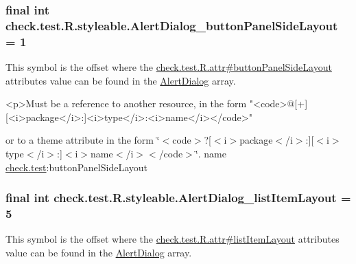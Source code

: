 \subsubsection[{Alert\+Dialog\+\_\+button\+Panel\+Side\+Layout}]{\setlength{\rightskip}{0pt plus 5cm}final int check.\+test.\+R.\+styleable.\+Alert\+Dialog\+\_\+button\+Panel\+Side\+Layout = 1\hspace{0.3cm}{\ttfamily [static]}}\label{classcheck_1_1test_1_1_r_1_1styleable_a929e9b246cebde3d26e0df79ede0734d}
This symbol is the offset where the \hyperlink{classcheck_1_1test_1_1_r_1_1attr_a32cad5c610a0ee38f68d1a530b5e5714}{check.\+test.\+R.\+attr\#button\+Panel\+Side\+Layout} attribute\textquotesingle{}s value can be found in the \hyperlink{classcheck_1_1test_1_1_r_1_1styleable_a1d9c160813dfdd546911e783935ebb65}{Alert\+Dialog} array.

\begin{DoxyVerb}      <p>Must be a reference to another resource, in the form "<code>@[+][<i>package</i>:]<i>type</i>:<i>name</i></code>"
\end{DoxyVerb}
 or to a theme attribute in the form \char`\"{}$<$code$>$?\mbox{[}$<$i$>$package$<$/i$>$\+:\mbox{]}\mbox{[}$<$i$>$type$<$/i$>$\+:\mbox{]}$<$i$>$name$<$/i$>$$<$/code$>$\char`\"{}.  name \hyperlink{namespacecheck_1_1test}{check.\+test}\+:button\+Panel\+Side\+Layout \hypertarget{classcheck_1_1test_1_1_r_1_1styleable_af8626e86eefaa84c9e393dc383c34a06}{}
\subsubsection[{Alert\+Dialog\+\_\+list\+Item\+Layout}]{\setlength{\rightskip}{0pt plus 5cm}final int check.\+test.\+R.\+styleable.\+Alert\+Dialog\+\_\+list\+Item\+Layout = 5\hspace{0.3cm}{\ttfamily [static]}}\label{classcheck_1_1test_1_1_r_1_1styleable_af8626e86eefaa84c9e393dc383c34a06}
This symbol is the offset where the \hyperlink{classcheck_1_1test_1_1_r_1_1attr_a48d0f730be695f88e2bd71a69c0605d8}{check.\+test.\+R.\+attr\#list\+Item\+Layout} attribute\textquotesingle{}s value can be found in the \hyperlink{classcheck_1_1test_1_1_r_1_1styleable_a1d9c160813dfdd546911e783935ebb65}{Alert\+Dialog} array.

